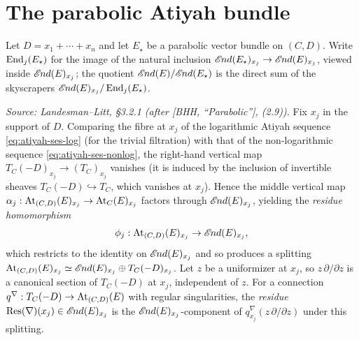 \section{The parabolic Atiyah bundle}
\label{sec:deformation-parabolic-atiyah}

Let $D = x_1 + \cdots + x_n$ and let $E_\star$ be a parabolic vector bundle on
$(C,D)$. Write $\operatorname{End}_j(E_\star)$ for the image of the natural inclusion
$\mathscr{E}\kern -1pt nd(E_\star)_{x_j} \to \mathscr{E}\kern -1pt nd(E)_{x_j}$, viewed inside
$\mathscr{E}\kern -1pt nd(E)_{x_j}$; the quotient $\mathscr{E}\kern -1pt nd(E)/\mathscr{E}\kern -1pt nd(E_\star)$ is the direct
sum of the skyscrapers $\mathscr{E}\kern -1pt nd(E)_{x_j}/\operatorname{End}_j(E_\star)$.

\begin{definition}
  \label{def:residue}
  \textit{Source: Landesman--Litt, \S3.2.1 (after [BHH, ``Parabolic''], (2.9)).}
  Fix $x_j$ in the support of $D$. Comparing the fibre at $x_j$ of the
  logarithmic Atiyah sequence \eqref{eq:atiyah-ses-log} (for the trivial
  filtration) with that of the non-logarithmic sequence
  \eqref{eq:atiyah-ses-nonlog}, the right-hand vertical map
  $T_C(-D)_{x_j} \to (T_C)_{x_j}$ vanishes (it is induced by the inclusion of
  invertible sheaves $T_C(-D) \hookrightarrow T_C$, which vanishes at $x_j$).
  Hence the middle vertical map $\alpha_j: \operatorname{At}_{(C,D)}(E)_{x_j} \to
  \operatorname{At}_C(E)_{x_j}$ factors through $\mathscr{E}\kern -1pt nd(E)_{x_j}$, yielding the
  \emph{residue homomorphism}
  \[
    \phi_j: \operatorname{At}_{(C,D)}(E)_{x_j} \to \mathscr{E}\kern -1pt nd(E)_{x_j},
  \]
  which restricts to the identity on $\mathscr{E}\kern -1pt nd(E)_{x_j}$ and so produces a
  splitting $\operatorname{At}_{(C,D)}(E)_{x_j} \simeq \mathscr{E}\kern -1pt nd(E)_{x_j} \oplus
  T_C(-D)_{x_j}$. Let $z$ be a uniformizer at $x_j$, so $z\,\partial/\partial z$
  is a canonical section of $T_C(-D)$ at $x_j$, independent of $z$. For a
  connection $q^\nabla: T_C(-D) \to \operatorname{At}_{(C,D)}(E)$ with regular
  singularities, the \emph{residue} $\operatorname{Res}(\nabla)(x_j) \in \mathscr{E}\kern -1pt nd(E)_{x_j}$
  is the $\mathscr{E}\kern -1pt nd(E)_{x_j}$-component of
  $q^\nabla_{x_j}(z\,\partial/\partial z)$ under this splitting.
\end{definition}

